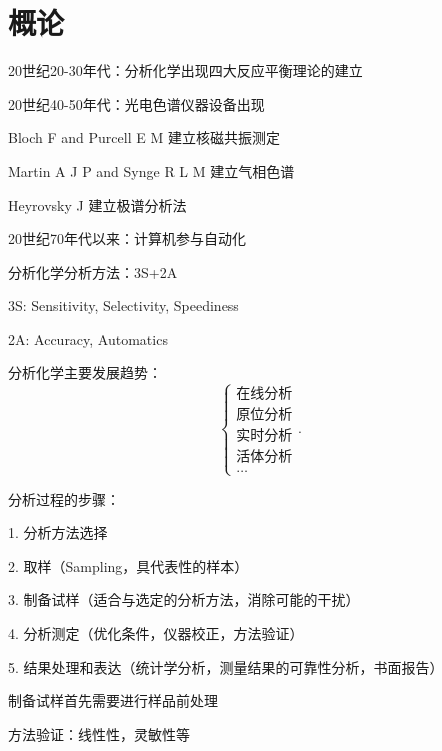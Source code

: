 \def\lecturer{王敏}
\def\noter{THF}
\def\className{Analysis Chemistry}
\def\term{III-B}



\maketitle
\tableofcontents
\section{概论}%
\label{sec:概论}
20世纪20-30年代：分析化学出现四大反应平衡理论的建立

20世纪40-50年代：光电色谱仪器设备出现
\begin{notation}
    Bloch F and Purcell E M 建立核磁共振测定

    Martin A J P and Synge R L M 建立气相色谱

    Heyrovsky J 建立极谱分析法
\end{notation}
20世纪70年代以来：计算机参与自动化

\begin{notation}
    分析化学分析方法：3S+2A

    3S: Sensitivity, Selectivity, Speediness
    
    2A: Accuracy, Automatics
\end{notation}
分析化学主要发展趋势：
\[
    \begin{cases}
        \mbox{在线分析}\\ 
        \mbox{原位分析}\\ 
        \mbox{实时分析}\\ 
        \mbox{活体分析}\\ 
        \ldots
    \end{cases}
.\] 
\begin{notation}
    分析过程的步骤：

    1. 分析方法选择

    2. 取样（Sampling，具代表性的样本）

    3. 制备试样（适合与选定的分析方法，消除可能的干扰）

    4. 分析测定（优化条件，仪器校正，方法验证）

    5. 结果处理和表达（统计学分析，测量结果的可靠性分析，书面报告）
\end{notation}
\begin{notation}
    制备试样首先需要进行样品前处理

    方法验证：线性性，灵敏性等
\end{notation}
